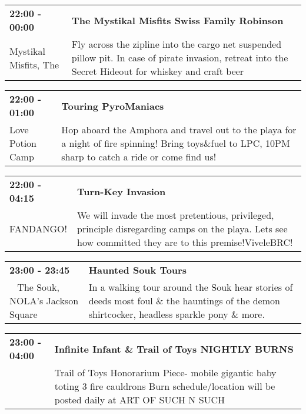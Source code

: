 \begin{tabular}{ p{1in} p{2.2in} }
    \textbf{22:00 - 00:00} & \textbf{The Mystikal Misfits Swiss Family Robinson} \\
    Mystikal Misfits, The \newline  & Fly across the zipline into the cargo net suspended pillow pit. In case of pirate invasion, retreat into the Secret Hideout for whiskey and craft beer \\
    \hline 
\end{tabular}
    
\begin{tabular}{ p{1in} p{2.2in} }
    \textbf{22:00 - 01:00} & \textbf{Touring PyroManiacs} \\
    Love Potion Camp \newline  & Hop aboard the Amphora and travel out to the playa for a night of fire spinning!  Bring toys\&fuel to LPC, 10PM sharp to catch a ride or come find us! \\
    \hline 
\end{tabular}
    
\begin{tabular}{ p{1in} p{2.2in} }
    \textbf{22:00 - 04:15} & \textbf{Turn-Key Invasion} \\
    FANDANGO! \newline  & We will invade the most pretentious, privileged, principle disregarding camps on the playa. Lets see how committed they are to this premise!ViveleBRC! \\
    \hline 
\end{tabular}
    
\begin{tabular}{ p{1in} p{2.2in} }
    \textbf{23:00 - 23:45} & \textbf{Haunted Souk Tours} \\
    ~ \newline The Souk, NOLA's Jackson Square & In a walking tour around the Souk hear stories of deeds most foul \& the hauntings of the demon shirtcocker, headless sparkle pony \& more. \\
    \hline 
\end{tabular}
    
\begin{tabular}{ p{1in} p{2.2in} }
    \textbf{23:00 - 04:00} & \textbf{Infinite Infant \& Trail of Toys NIGHTLY BURNS} \\
    ~ \newline  & Trail of Toys Honorarium Piece- mobile gigantic baby toting 3 fire cauldrons Burn schedule/location will be posted daily at ART OF SUCH N SUCH \\
    \hline 
\end{tabular}
    
